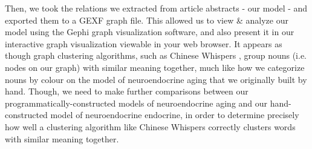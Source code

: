 Then, we took the relations we extracted from article abstracts - our model - and exported them to a GEXF graph file.
This allowed us to view \& analyze our model using the Gephi graph visualization software, and also present it in our interactive graph
visualization viewable in your web browser. It appears as though graph clustering algorithms, such as Chinese Whispers \cite{Biemann:2006:CWE:1654758.1654774}
, group nouns (i.e. nodes on our graph) with similar meaning together, much like how we categorize nouns by colour on the model of neuroendocrine
aging that we originally built by hand. Though, we need to make further comparisons between our programmatically-constructed
models of neuroendocrine aging and our hand-constructed model of neuroendocrine endocrine, in order to determine precisely how well a
clustering algorithm like Chinese Whispers correctly clusters words with similar meaning together.
